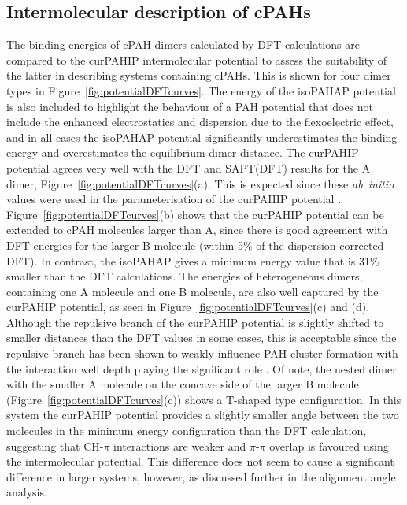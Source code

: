 \subsection{Intermolecular description of cPAHs}  %
%
The binding energies of cPAH dimers calculated by DFT calculations are compared to the curPAHIP intermolecular potential to assess the suitability of the latter in describing systems containing cPAHs. This is shown for four dimer types in Figure~\ref{fig:potentialDFTcurves}. The energy of the isoPAHAP potential is also included to highlight the behaviour of a PAH potential that does not include the enhanced electrostatics and dispersion due to the flexoelectric effect, and in all cases the isoPAHAP potential significantly underestimates the binding energy and overestimates the equilibrium dimer distance.
The curPAHIP potential agrees very well with the DFT and SAPT(DFT) results for the A dimer, Figure~\ref{fig:potentialDFTcurves}(a). This is expected since these \textit{ab~initio} values were used in the parameterisation of the curPAHIP potential \cite{bowal2019ion}. 
Figure~\ref{fig:potentialDFTcurves}(b) shows that the curPAHIP potential can be extended to cPAH molecules larger than A, since there is good agreement with DFT energies for the larger B molecule (within 5\% of the dispersion-corrected DFT). In contrast, the isoPAHAP gives a minimum energy value that is 31\% smaller than the DFT calculations.
The energies of heterogeneous dimers, containing one A molecule and one B molecule, are also well captured by the curPAHIP potential, as seen in Figure~\ref{fig:potentialDFTcurves}(c) and (d). Although the repulsive branch of the curPAHIP potential is slightly shifted to smaller distances than the DFT values in some cases, this is acceptable since the repulsive branch has been shown to weakly influence PAH cluster formation with the interaction well depth playing the significant role \cite{Pascazio2017}. Of note, the nested dimer with the smaller A molecule on the concave side of the larger B molecule (Figure~\ref{fig:potentialDFTcurves}(c)) shows a T-shaped type configuration. In this system the curPAHIP potential provides a slightly smaller %
angle between the two molecules in the minimum energy configuration than the DFT calculation, suggesting that CH-$\pi$ interactions are weaker and $\pi$-$\pi$ overlap is favoured using the intermolecular potential.  This difference does not seem to cause a significant difference in larger systems, however, as discussed further in the alignment angle analysis. %
